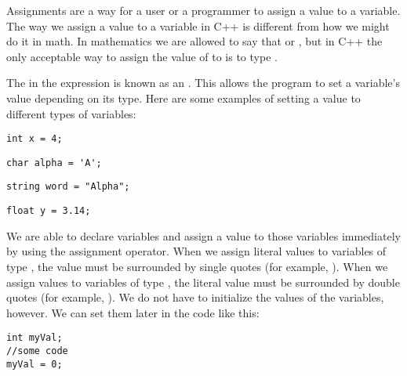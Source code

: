 
Assignments are a way for a user or a programmer to assign a value to a variable. 
The way we assign a value to a variable in C++ is different from how we might do it in math. 
In mathematics we are allowed to say that  or , but in C++ the only acceptable way to assign the value of  to  is to type . 

The \Code{=} in the expression  is known as an . 
This allows the program to set a variable's value depending on its type. 
Here are some examples of setting a value to different types of variables:

\noindent\begin{minipage}{\linewidth}\begin{lstlisting}
int x = 4;
\end{lstlisting}\end{minipage}

\noindent\begin{minipage}{\linewidth}\begin{lstlisting}
char alpha = 'A';
\end{lstlisting}\end{minipage}

\noindent\begin{minipage}{\linewidth}\begin{lstlisting}
string word = "Alpha";
\end{lstlisting}\end{minipage}

\noindent\begin{minipage}{\linewidth}\begin{lstlisting}
float y = 3.14;
\end{lstlisting}\end{minipage}

We are able to declare variables and assign a value to those variables immediately by using the assignment operator. 
When we assign literal values to variables of type , the value must be surrounded by single quotes (for example, ). 
When we assign values to variables of type , the literal value must be surrounded by double quotes (for example, ). 
We do not have to initialize the values of the variables, however. 
We can set them later in the code like this:

\noindent\begin{minipage}{\linewidth}\begin{lstlisting}
int myVal;
//some code
myVal = 0; 
\end{lstlisting}\end{minipage}

